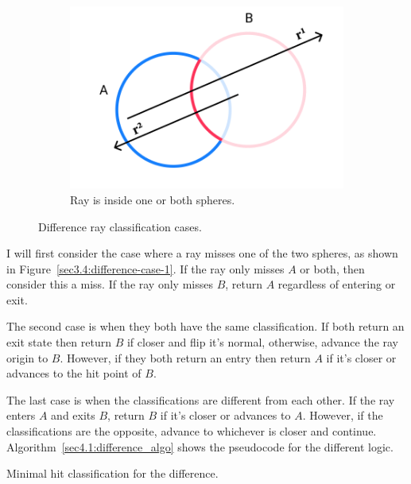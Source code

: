 \documentclass[a4paper,11pt,oneside]{article}
\begin{document}
\begin{figure}[H]
	\hfill
	\begin{subfigure}[b]{0.3\textwidth}
		\centering
		\includegraphics[width=\textwidth]{section4/4.1/difference-case-3.png}
		\caption{Ray is inside one or both spheres.}
		\label{sec3.4:difference-case-3}
	\end{subfigure}
	\caption{Difference ray classification cases.}
	\label{sec3.4:sphere-difference}
\end{figure}


I will first consider the case where a ray misses one of the two spheres, as shown in Figure~\ref{sec3.4:difference-case-1}. If the ray only misses $A$ or both, then consider this a miss. If the ray only misses $B$, return $A$ regardless of entering or exit.

The second case is when they both have the same classification. If both return an exit state then return $B$ if closer and flip it's normal, otherwise, advance the ray origin to $B$. However, if they both return an entry then return $A$ if it's closer or advances to the hit point of $B$.

The last case is when the classifications are different from each other. If the ray enters $A$ and exits $B$, return $B$ if it's closer or advances to $A$. However, if the classifications are the opposite, advance to whichever is closer and continue. Algorithm~\ref{sec4.1:difference_algo} shows the pseudocode for the different logic.

\begin{algorithm}[H]
	\SetAlgoLined
	\caption{Minimal hit classification for the difference.}
	\label{sec4.1:difference_algo}
\end{algorithm} 
\end{document}
